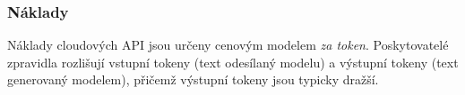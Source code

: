\subsubsection*{Náklady}
\label{subsubsec:deployment-cloud-costs}

Náklady cloudových API jsou určeny cenovým modelem \textit{za token}.
Poskytovatelé zpravidla rozlišují vstupní tokeny (text odesílaný modelu) a výstupní tokeny (text generovaný modelem), přičemž výstupní tokeny jsou typicky dražší.

%
\newcommand{\chainInToks}{9053}
\newcommand{\chainOutToks}{5149}
\newcommand{\oneshotInToks}{2043}
\newcommand{\oneshotOutToks}{501}

\newcommand{\computecost}[4]{%
  \begingroup
  \pgfkeys{/pgf/fpu, /pgf/fpu/output format=fixed}%
  \pgfmathparse{(#3 * (#1 / 1000000)) + (#4 * (#2 / 1000000))}%
  \pgfmathsetmacro{\myresult}{\pgfmathresult}%
  \pgfkeys{/pgf/fpu=false}%
  \pgfkeys{/pgf/number format/.cd, use comma, fixed, precision=4}%
  \pgfmathprintnumber{\myresult}%
  \endgroup
}

\newcommand{\computeCostCOT}[2]{%
  \computecost{#1}{#2}{\chainInToks}{\chainOutToks}%
}

\newcommand{\computeCostOS}[2]{%
  \computecost{#1}{#2}{\oneshotInToks}{\oneshotOutToks}%
}

